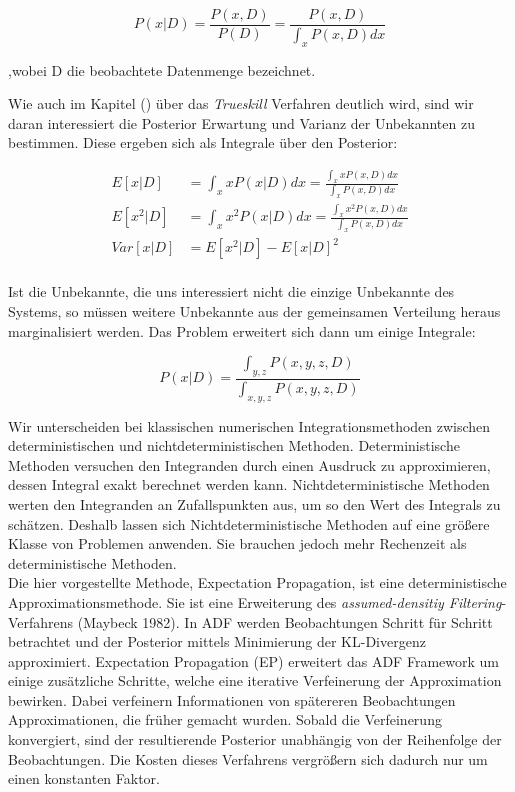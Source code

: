 \documentclass[12pt,a4paper]{scrartcl}
\numberwithin{equation}{section}
\begin{document}
{  \begin{equation}
   P(x|D) = \frac{P(x,D)}{P(D)} = \frac{P(x,D)}{\int_x P(x,D) dx}
  \end{equation}
  
  ,wobei D die beobachtete Datenmenge bezeichnet. 
  
  Wie auch im Kapitel () über das \textit{Trueskill} Verfahren deutlich wird, sind wir daran interessiert
  die Posterior Erwartung und Varianz der Unbekannten zu bestimmen. Diese ergeben sich als Integrale 
  über den Posterior: 
  
  \begin{equation}
  \begin{split}
   E[x|D] &= \int_x xP(x|D) dx = \frac{\int_x x P(x,D) dx}{\int_x P(x,D) dx } \\
   E[x^2|D] &= \int_x x^2P(x|D) dx = \frac{\int_x x^2 P(x,D) dx}{\int_x P(x,D) dx } \\
   Var[x|D] &= E[x^2|D] - E[x|D]^2 \\
  \end{split}
  \end{equation}
  
  Ist die Unbekannte, die uns interessiert nicht die einzige Unbekannte des Systems, so müssen weitere Unbekannte
  aus der gemeinsamen Verteilung heraus marginalisiert werden. Das Problem erweitert sich dann um einige Integrale: 
  
  \begin{equation}
   P(x|D) = \frac{\int_{y,z} P(x,y,z,D)}{\int_{x,y,z} P(x,y,z,D)}
  \end{equation}

  Wir unterscheiden bei klassischen numerischen Integrationsmethoden zwischen deterministischen und nichtdeterministischen Methoden. 
  Deterministische Methoden versuchen den Integranden durch einen Ausdruck zu approximieren, dessen Integral
  exakt berechnet werden kann. Nichtdeterministische Methoden werten den Integranden an Zufallspunkten aus, um
  so den Wert des Integrals zu schätzen. Deshalb lassen sich Nichtdeterministische Methoden auf eine größere Klasse von Problemen 
  anwenden. Sie brauchen jedoch mehr Rechenzeit als deterministische Methoden. \\
  Die hier vorgestellte Methode, Expectation Propagation, ist eine deterministische Approximationsmethode. 
  Sie ist eine Erweiterung des \textit{assumed-densitiy Filtering}-Verfahrens (Maybeck 1982).
  In ADF werden Beobachtungen Schritt für Schritt betrachtet und der Posterior mittels Minimierung der KL-Divergenz approximiert.
  Expectation Propagation (EP) erweitert das ADF Framework um einige zusätzliche Schritte, welche eine 
  iterative Verfeinerung der Approximation bewirken. Dabei verfeinern Informationen von spätereren
  Beobachtungen Approximationen, die früher gemacht wurden. Sobald die Verfeinerung konvergiert, sind der resultierende
  Posterior unabhängig von der Reihenfolge der Beobachtungen.
  Die Kosten dieses Verfahrens vergrößern sich dadurch nur um einen konstanten Faktor. 
  
}
\end{document}
